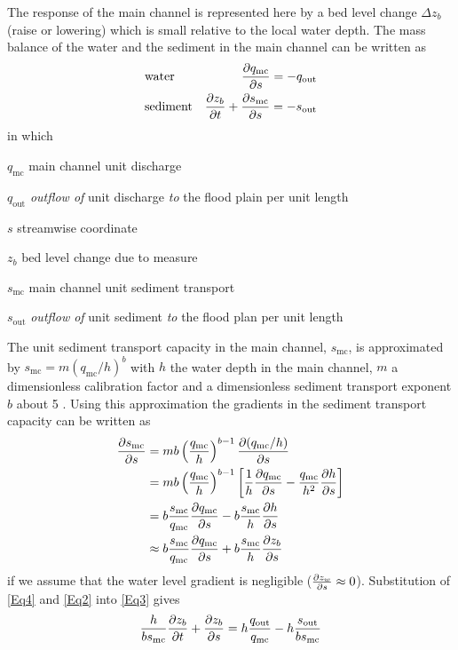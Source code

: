 The response of the main channel is represented here by a bed level change $\Delta z_b$  (raise or lowering) which is small relative to the local water depth.
The mass balance of the water and the sediment in the main channel can be written as
%
\begin{align}
&\text{water} & \pdiff{q_\text{mc}}{s} = -q_\text{out} \label{Eq2} \\
&\text{sediment} & \pdiff{z_b}{t} + \pdiff{s_\text{mc}}{s} = -s_\text{out} \label{Eq3}
\end{align}
%
in which
%
\begin{symbollist}
\item[$q_\text{mc}$] main channel unit discharge 
\item[$q_\text{out}$] \emph{outflow of} unit discharge \emph{to} the flood plain per unit length 
\item[$s$] streamwise coordinate 
\item[$z_b$] bed level change due to measure 
\item[$s_\text{mc}$] main channel unit sediment transport 
\item[$s_\text{out}$] \emph{outflow of} unit sediment \emph{to} the flood plan per unit length 
\end{symbollist}

The unit sediment transport capacity in the main channel, $s_\text{mc}$, is approximated by $s_\text{mc} = m \left ( q_\text{mc} / h \right )^b$ with $h$ the water depth  in the main channel, $m$ a dimensionless calibration factor and a dimensionless sediment transport exponent $b$ about 5 \citep{Engelundh67}.
Using this approximation the gradients in the sediment transport capacity can be written as
%
\begin{align}
\pdiff{s_\text{mc}}{s} &= m b \left ( \frac{q_\text{mc}}{h} \right )^{b-1} \pdiff{(q_\text{mc} / h)}{s} \\
&= m b \left ( \frac{q_\text{mc}}{h} \right )^{b-1} \left [ \frac{1}{h} \pdiff{q_\text{mc}}{s} - \frac{q_\text{mc}}{h^2} \pdiff{h}{s} \right ] \\
&= b \frac{s_\text{mc}}{q_\text{mc}} \pdiff{q_\text{mc}}{s} - b \frac{s_\text{mc}}{h} \pdiff{h}{s} \\
&\approx b \frac{s_\text{mc}}{q_\text{mc}} \pdiff{q_\text{mc}}{s} + b \frac{s_\text{mc}}{h} \pdiff{z_b}{s}
\label{Eq4}
\end{align}
%
if we assume that the water level gradient is negligible ($\pdiff{z_w}{s} \approx 0$).
Substitution of \autoref{Eq4} and \autoref{Eq2} into \autoref{Eq3} gives
%
\begin{equation}
\frac{h}{b s_\text{mc}} \pdiff{z_b}{t} + \pdiff{z_b}{s} = h \frac{q_\text{out}}{q_\text{mc}} - h \frac{s_\text{out}}{b s_\text{mc}}
\label{Eq5}
\end{equation}

